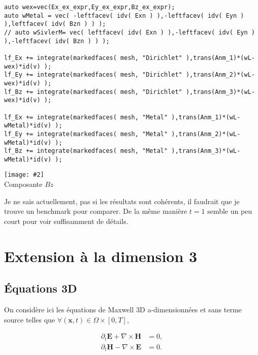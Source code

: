\documentclass[a4paper,oneside,10pt]{report}
\makeatletter
\newcommand\Image[3][]{%
  \tabular[b]{@{}c@{}}\texttt{[image: \#2]}\\
    #3
  \endtabular}
\makeatother
\begin{document}
\begin{center}
\begin{minipage}{\textwidth}
\begin{lstlisting}[label=code2,caption=Conditions aux bords]
auto wex=vec(Ex_ex_expr,Ey_ex_expr,Bz_ex_expr);
auto wMetal = vec( -leftfacev( idv( Exn ) ),-leftfacev( idv( Eyn ) ),leftfacev( idv( Bzn ) ) );
// auto wSivlerM= vec( leftfacev( idv( Exn ) ),-leftfacev( idv( Eyn ) ),-leftfacev( idv( Bzn ) ) );

lf_Ex += integrate(markedfaces( mesh, "Dirichlet" ),trans(Anm_1)*(wL-wex)*id(v) );
lf_Ey += integrate(markedfaces( mesh, "Dirichlet" ),trans(Anm_2)*(wL-wex)*id(v) );
lf_Bz += integrate(markedfaces( mesh, "Dirichlet" ),trans(Anm_3)*(wL-wex)*id(v) );

lf_Ex += integrate(markedfaces( mesh, "Metal" ),trans(Anm_1)*(wL-wMetal)*id(v) );
lf_Ey += integrate(markedfaces( mesh, "Metal" ),trans(Anm_2)*(wL-wMetal)*id(v) );
lf_Bz += integrate(markedfaces( mesh, "Metal" ),trans(Anm_3)*(wL-wMetal)*id(v) );
\end{lstlisting}
\end{minipage}
\end{center}


\begin{center}
\Image[width=0.7\linewidth]{./fig/Fig2.png}{Composante $Bz$}
\end{center}

Je ne sais actuellement, pas si les résultats sont cohérents, il faudrait que je trouve un benchmark pour comparer. De la même manière $t=1$ semble un peu court pour voir suffisamment de détails.
\chapter{Extension à la dimension 3}
\section{Équations 3D}
On considère ici les équations de Maxwell 3D a-dimensionnées et sans terme source telles que $\forall (\mathbf{x},t) \in \Omega \times [0,T]$,

\begin{equation}
\begin{aligned}
\label{eq:1}
\partial_t \mathbf{E} + \nabla \times \mathbf{H} &= 0,\\
\partial_t \mathbf{H} - \nabla \times \mathbf{E} &= 0.
\end{aligned}
\end{equation}
\end{document}
